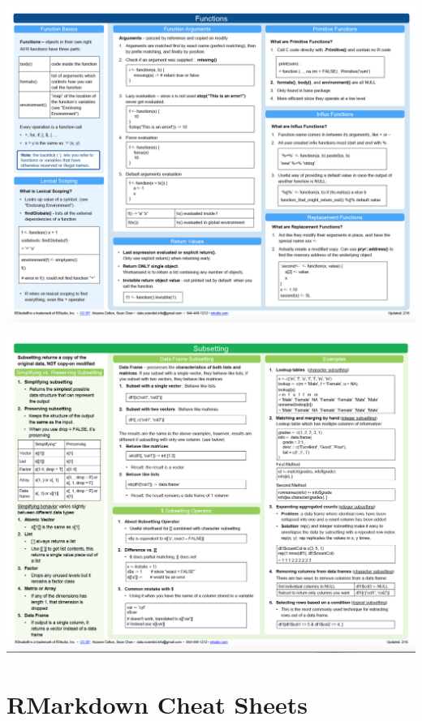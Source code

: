 \documentclass[
]{book}
\theoremstyle{definition}
\theoremstyle{definition}
\theoremstyle{definition}
\theoremstyle{definition}
\theoremstyle{remark}
\begin{document}
\begin{center}\includegraphics{Figures/R-cheat-sheet2} \end{center}

\begin{center}\includegraphics{Figures/R-cheat-sheet3} \end{center}

\hypertarget{rmarkdown-cheat-sheets}{%
\section*{RMarkdown Cheat Sheets}\label{rmarkdown-cheat-sheets}}
\end{document}

